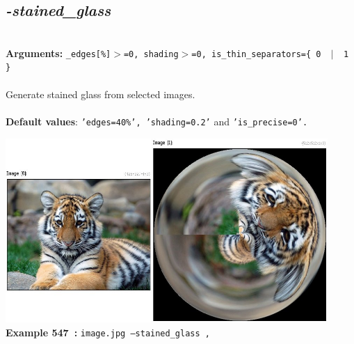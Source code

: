 \documentclass[a4paper,11pt,twoside]{book}
\begin{document}
\subsection{\emph{-stained\_glass} }\vspace*{-0.5em}
~\\\textbf{Arguments: } 
{\small \texttt{\_edges[\%]$>$=0, shading$>$=0, is\_thin\_separators=\{ 0 ~$|$~ 1 \}}}\\~\\
Generate stained glass from selected images.
~\\~\\\textbf{Default values}: {\small \texttt{'edges=40\%', 'shading=0.2'} and \texttt{'is\_precise=0'.}}
\begin{center}\includegraphics[keepaspectratio=true,height=7cm,width=\textwidth]{img/gmic_def547.jpg}\\
{\footnotesize \textbf{Example 547~:} \texttt{image.jpg --stained\_glass ,}}
\end{center}
\end{document}
